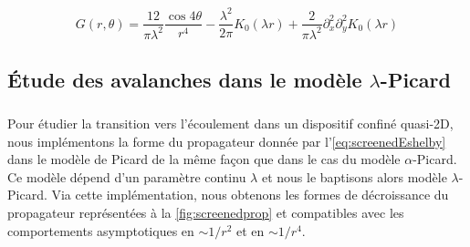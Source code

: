 \begin{equation}
    G(r,\theta) = \frac{12}{\pi\lambda^2}\frac{\cos 4\theta}{r^4}-\frac{\lambda^2}{2\pi}K_0(\lambda r)+\frac{2}{\pi\lambda^2}\partial_x^2\partial_y^2K_0(\lambda r)
\end{equation}

%
%
%

\subsection{Étude des avalanches dans le modèle $\lambda$-Picard}

\label{sec:screenedav}

\subparagraph{}Pour étudier la transition vers l'écoulement dans un dispositif confiné quasi-2D, nous implémentons la forme du propagateur donnée par l'\autoref{eq:screenedEshelby} dans le modèle de Picard de la même façon que dans le cas du modèle $\alpha$-Picard. Ce modèle dépend d'un paramètre continu $\lambda$ et nous le baptisons alors modèle $\lambda$-Picard. Via cette implémentation, nous obtenons les formes de décroissance du propagateur représentées à la \autoref{fig:screenedprop} et compatibles avec les comportements asymptotiques en $\sim 1/r^2$ et en $\sim 1/r^4$.

